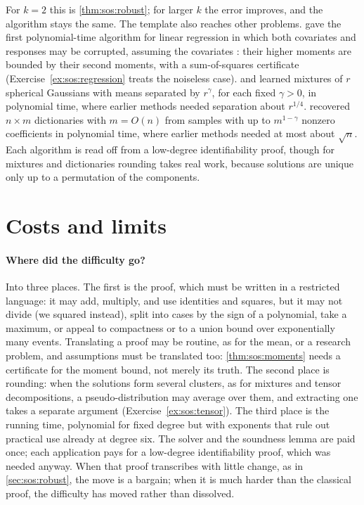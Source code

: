 \begin{refsection}
For $k=2$ this is \cref{thm:sos:robust}; for larger $k$ the error improves, and the algorithm stays the same. The template also reaches other problems. \textcite{Klivans2018} gave the first polynomial-time algorithm for linear regression in which both covariates and responses may be corrupted, assuming the covariates : their higher moments are bounded by their second moments, with a sum-of-squares certificate (Exercise~\ref{ex:sos:regression} treats the noiseless case). \textcite{HopkinsLi2018} and \textcite{Kothari2018} learned mixtures of $r$ spherical Gaussians with means separated by $r^\gamma$, for each fixed $\gamma>0$, in polynomial time, where earlier methods needed separation about $r^{1/4}$. \textcite{BarakKelnerSteurer2015} recovered $n\times m$ dictionaries with $m=O(n)$ from samples with up to $m^{1-\gamma}$ nonzero coefficients in polynomial time, where earlier methods needed at most about $\sqrt n$. Each algorithm is read off from a low-degree identifiability proof, though for mixtures and dictionaries rounding takes real work, because solutions are unique only up to a permutation of the components.

\section{Costs and limits}\label{sec:sos:costs}

\paragraph{Where did the difficulty go?} Into three places. The first is the proof, which must be written in a restricted language: it may add, multiply, and use identities and squares, but it may not divide (we squared instead), split into cases by the sign of a polynomial, take a maximum, or appeal to compactness or to a union bound over exponentially many events. Translating a proof may be routine, as for the mean, or a research problem, and assumptions must be translated too: \cref{thm:sos:moments} needs a certificate for the moment bound, not merely its truth. The second place is rounding: when the solutions form several clusters, as for mixtures and tensor decompositions, a pseudo-distribution may average over them, and extracting one takes a separate argument (Exercise~\ref{ex:sos:tensor}). The third place is the running time, polynomial for fixed degree but with exponents that rule out practical use already at degree six. The solver and the soundness lemma are paid once; each application pays for a low-degree identifiability proof, which was needed anyway. When that proof transcribes with little change, as in \cref{sec:sos:robust}, the move is a bargain; when it is much harder than the classical proof, the difficulty has moved rather than dissolved.


\end{refsection}
